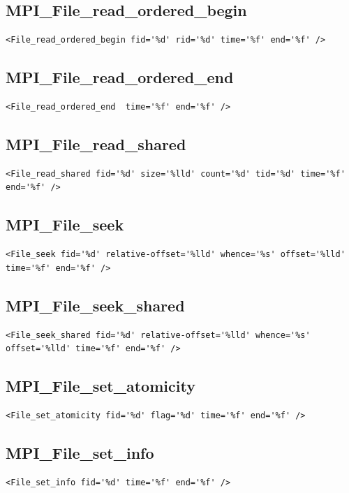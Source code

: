 \documentclass[a4paper,12pt,pdftex]{scrartcl}
\begin{document}
\subsection{MPI\_File\_read\_ordered\_begin}
\begin{lstlisting}
<File_read_ordered_begin fid='%d' rid='%d' time='%f' end='%f' />
\end{lstlisting}

\subsection{MPI\_File\_read\_ordered\_end}
\begin{lstlisting}
<File_read_ordered_end  time='%f' end='%f' />
\end{lstlisting}

\subsection{MPI\_File\_read\_shared}
\begin{lstlisting}
<File_read_shared fid='%d' size='%lld' count='%d' tid='%d' time='%f' end='%f' />
\end{lstlisting}

\subsection{MPI\_File\_seek}
\begin{lstlisting}
<File_seek fid='%d' relative-offset='%lld' whence='%s' offset='%lld' time='%f' end='%f' />
\end{lstlisting}

\subsection{MPI\_File\_seek\_shared}
\begin{lstlisting}
<File_seek_shared fid='%d' relative-offset='%lld' whence='%s' offset='%lld' time='%f' end='%f' />
\end{lstlisting}

\subsection{MPI\_File\_set\_atomicity}
\begin{lstlisting}
<File_set_atomicity fid='%d' flag='%d' time='%f' end='%f' />
\end{lstlisting}

\subsection{MPI\_File\_set\_info}
\begin{lstlisting}
<File_set_info fid='%d' time='%f' end='%f' />
\end{lstlisting}
\end{document}
